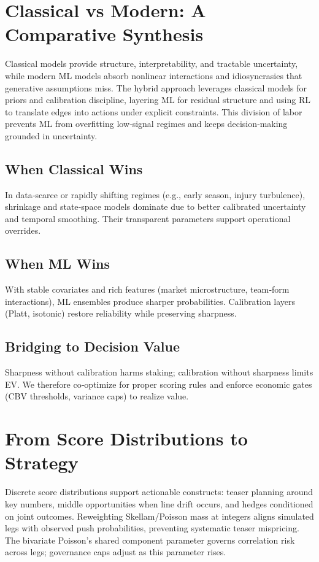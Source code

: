 \section{Classical vs Modern: A Comparative Synthesis}
Classical models provide structure, interpretability, and tractable uncertainty, while modern ML models absorb nonlinear interactions and idiosyncrasies that generative assumptions miss. The hybrid approach leverages classical models for priors and calibration discipline, layering ML for residual structure and using RL to translate edges into actions under explicit constraints. This division of labor prevents ML from overfitting low‑signal regimes and keeps decision‑making grounded in uncertainty.

\subsection{When Classical Wins}
In data‑scarce or rapidly shifting regimes (e.g., early season, injury turbulence), shrinkage and state‑space models dominate due to better calibrated uncertainty and temporal smoothing. Their transparent parameters support operational overrides.

\subsection{When ML Wins}
With stable covariates and rich features (market microstructure, team‑form interactions), ML ensembles produce sharper probabilities. Calibration layers (Platt, isotonic) restore reliability while preserving sharpness.

\subsection{Bridging to Decision Value}
Sharpness without calibration harms staking; calibration without sharpness limits EV. We therefore co‑optimize for proper scoring rules and enforce economic gates (CBV thresholds, variance caps) to realize value.

\section{From Score Distributions to Strategy}
Discrete score distributions support actionable constructs: teaser planning around key numbers, middle opportunities when line drift occurs, and hedges conditioned on joint outcomes. Reweighting Skellam/Poisson mass at integers aligns simulated legs with observed push probabilities, preventing systematic teaser mispricing. The bivariate Poisson’s shared component parameter governs correlation risk across legs; governance caps adjust as this parameter rises.

